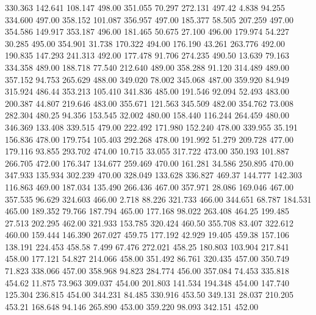  330.363  142.641  108.147       498.00
 351.055   70.297  272.131       497.42
   4.838   94.255  334.600       497.00
 358.152  101.087  356.957       497.00
 185.377   58.505  207.259       497.00
 354.586  149.917  353.187       496.00
 181.465   50.675   27.100       496.00
 179.974   54.227   30.285       495.00
 354.901   31.738  170.322       494.00
 176.190   43.261  263.776       492.00
 190.835  147.293  241.313       492.00
 177.478   91.706  274.235       490.50
  13.639   79.163  334.358       489.00
 188.718   77.540  212.640       489.00
 358.288   91.120  314.489       489.00
 357.152   94.753  265.629       488.00
 349.020   78.002  345.068       487.00
 359.920   84.949  315.924       486.44
 353.213  105.410  341.836       485.00
 191.546   92.094   52.493       483.00
 200.387   44.807  219.646       483.00
 355.671  121.563  345.509       482.00
 354.762   73.008  282.304       480.25
  94.356  153.545   32.002       480.00
 158.440  116.244  264.459       480.00
 346.369  133.408  339.515       479.00
 222.492  171.980  152.240       478.00
 339.955   35.191  156.836       478.00
 179.754  105.403  292.268       478.00
 191.992   51.279  209.728       477.00
 179.116   93.855  293.702       474.00
  10.715   33.055  317.722       473.00
 350.193  101.887  266.705       472.00
 176.347  134.677  259.469       470.00
 161.281   34.586  250.895       470.00
 347.933  135.934  302.239       470.00
 328.049  133.628  336.827       469.37
 144.777  142.303  116.863       469.00
 187.034  135.490  266.436       467.00
 357.971   28.086  169.046       467.00
 357.535   96.629  324.603       466.00
   2.718   88.226  321.733       466.00
 344.651   68.787  184.531       465.00
 189.352   79.766  187.794       465.00
 177.168   98.022  263.408       464.25
 199.485   27.513  202.295       462.00
 321.933  153.785  320.424       460.50
 355.708   83.407  322.612       460.00
 159.444  146.390  267.027       459.75
 177.192   42.929   19.405       459.38
 157.106  138.191  224.453       458.58
   7.499   67.476  272.021       458.25
 180.803  103.904  217.841       458.00
 177.121   54.827  214.066       458.00
 351.492   86.761  320.435       457.00
 350.749   71.823  338.066       457.00
 358.968   94.823  284.774       456.00
 357.084   74.453  335.818       454.62
  11.875   73.963  309.037       454.00
 201.803  141.534  194.348       454.00
 147.740  125.304  236.815       454.00
 344.231   84.485  330.916       453.50
 349.131   28.037  210.205       453.21
 168.648   94.146  265.890       453.00
 359.220   98.093  342.151       452.00
